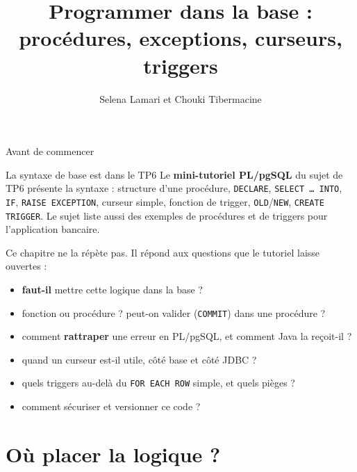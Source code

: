 \documentclass[aspectratio=169,10pt]{beamer}
\title{Programmer dans la base : proc\'edures, exceptions, curseurs, triggers}
\author[C. Tibermacine]{Selena Lamari et Chouki Tibermacine}
\date{}
\begin{document}

\begin{frame}{Avant de commencer}
  \begin{alertblock}{La syntaxe de base est dans le TP6}
    Le \textbf{mini-tutoriel PL/pgSQL} du sujet de TP6 pr\'esente la syntaxe : structure d'une proc\'edure,
    \texttt{DECLARE}, \texttt{SELECT \ldots{} INTO}, \texttt{IF}, \texttt{RAISE EXCEPTION}, curseur simple,
    fonction de trigger, \texttt{OLD}/\texttt{NEW}, \texttt{CREATE TRIGGER}. Le sujet liste aussi des
    exemples de proc\'edures et de triggers pour l'application bancaire.
  \end{alertblock}
  \vspace{2mm}
  Ce chapitre ne la r\'ep\`ete pas. Il r\'epond aux questions que le tutoriel laisse ouvertes :
  \begin{itemize}
    \item \textbf{faut-il} mettre cette logique dans la base ?
    \item fonction ou proc\'edure ? peut-on valider (\texttt{COMMIT}) dans une proc\'edure ?
    \item comment \textbf{rattraper} une erreur en PL/pgSQL, et comment Java la re\c{c}oit-il ?
    \item quand un curseur est-il utile, c\^ot\'e base et c\^ot\'e JDBC ?
    \item quels triggers au-del\`a du \texttt{FOR EACH ROW} simple, et quels pi\`eges ?
    \item comment s\'ecuriser et versionner ce code ?
  \end{itemize}
\end{frame}

\section{O\`u placer la logique ?}
\end{document}
